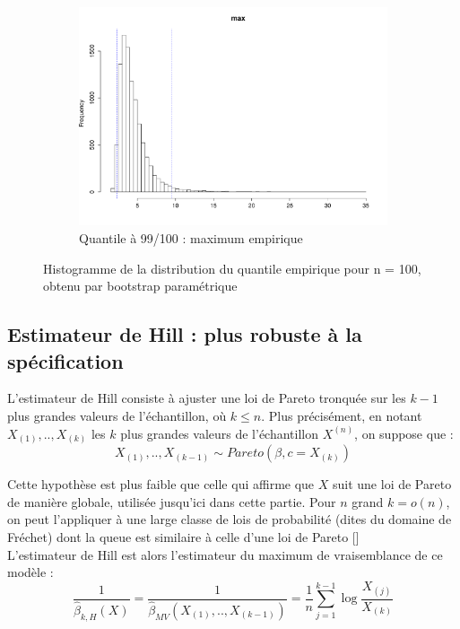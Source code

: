 \documentclass{article}
\renewcommand*{\(}{ \left( }
\renewcommand*{\)}{ \right) }
\begin{document}
\begin{figure}[H]
\begin{subfigure}[t]{0.3\textwidth}
        \includegraphics[width = \linewidth]{img/BootstrapParamEMV-Max-100.pdf}
        \caption{Quantile à 99/100 : maximum empirique}
        \label{fig:BPEMVMaxb}
    \end{subfigure}%
    \caption{Histogramme de la distribution du quantile empirique pour n = 100, obtenu par bootstrap paramétrique}
    \label{fig:BPEMVb}
\end{figure}


\subsection{Estimateur de Hill : plus robuste à la spécification}

L'estimateur de Hill consiste à ajuster une loi de Pareto tronquée sur les $k-1$ plus grandes valeurs de l'échantillon, où $k \leq n$. Plus précisément, en notant $X_{(1)},..,X_{(k)}$ les $k$ plus grandes valeurs de l'échantillon $X^{(n)}$, on suppose que :
\[ X_{(1)},..,X_{(k-1)} \sim Pareto(\beta,c=X_{(k)}) \]

Cette hypothèse est plus faible que celle qui affirme que $X$ suit une loi de Pareto de manière globale, utilisée jusqu'ici dans cette partie. Pour $n$ grand $k = o(n)$, on peut l'appliquer à une large classe de lois de probabilité (dites du domaine de Fréchet) dont la queue est similaire à celle d'une loi de Pareto [\cite{Planchet}]\\ 

L'estimateur de Hill est alors l'estimateur du maximum de vraisemblance de ce modèle :
\[ \frac{1}{\widehat{\beta}_{k,H}(X)} = \frac{1}{\widehat{\beta}_{MV}(X_{(1)},..,X_{(k-1)})} = \frac{1}{n} \sum_{j=1}^{k-1}\log \frac{X_{(j)}}{X_{(k)}} \]
\end{document}
